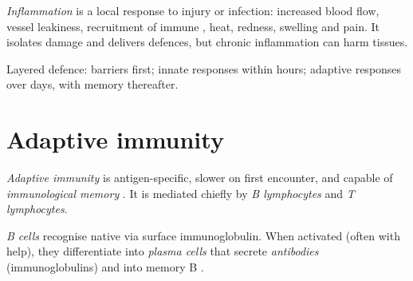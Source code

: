 \begin{definition}[Inflammation]\label{def:g12:immunity:inflammation}
\emph{Inflammation} is a local response to injury or
infection: increased blood flow, vessel leakiness, recruitment of
immune , heat, redness, swelling and pain. It isolates damage and
delivers defences, but chronic inflammation can harm tissues.
\end{definition}

\begin{omfigure}

{\small Layered defence: barriers first; innate responses within hours;
adaptive responses over days, with memory thereafter.}
\end{omfigure}

\section{Adaptive immunity}

\begin{definition}\label{def:g12:immunity:adaptive}
\emph{Adaptive immunity} is antigen-specific,
slower on first encounter, and capable of \emph{immunological memory}
. It is mediated chiefly by \emph{B
lymphocytes} and \emph{T lymphocytes}.
\end{definition}

\begin{definition}\label{def:g12:immunity:bcell}
\emph{B cells} recognise native  via surface
immunoglobulin. When activated (often with  help), they
differentiate into \emph{plasma cells} that secrete
\emph{antibodies} (immunoglobulins) and into memory B
.
\end{definition}

